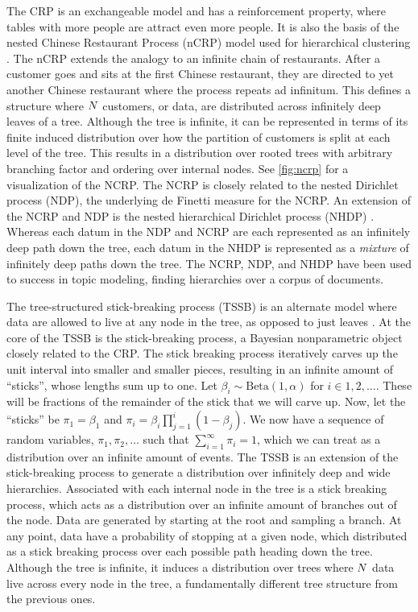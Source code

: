 The CRP is an exchangeable model
and has a reinforcement property, where
tables with more people are attract 
even more people. It is
also the basis of the nested Chinese
Restaurant Process (nCRP) model
used for hierarchical clustering \citep{Blei2010}.
The nCRP extends the analogy to
an infinite chain of restaurants.
After a customer goes and sits
at the first Chinese restaurant,
they are directed to yet another
Chinese restaurant where the process
repeats ad infinitum. This defines
a structure where $N$ customers, or data,
are distributed
across infinitely deep leaves of a tree.
Although the tree is infinite,
it can be represented in terms of its
finite induced distribution over
how the partition of customers is split
at each level of the tree. 
This results in a distribution over rooted trees
with arbitrary branching factor and ordering over internal nodes.
See \autoref{fig:ncrp} for a visualization of the NCRP.
The NCRP
is closely related to the nested Dirichlet process (NDP),
the underlying de Finetti measure for the NCRP.
An extension
of the NCRP and NDP is the nested hierarchical Dirichlet
process (NHDP) \citep{Paisley2014}. Whereas each datum in the NDP and NCRP
are each represented as an infinitely deep path
down the tree, each datum in the NHDP
is represented as a \emph{mixture} of
infinitely deep paths down the tree. 
The NCRP, NDP, and NHDP have been used to success
in topic modeling, finding hierarchies over
a corpus of documents.

The tree-structured stick-breaking process (TSSB)
is an alternate model 
where data are allowed to live at any node
in the tree, as opposed to just leaves \citep{Adams2010}.
At the core of the TSSB is the
stick-breaking process, a Bayesian nonparametric object
closely related to the CRP.
The stick breaking process
iteratively carves up the unit interval
into smaller and smaller pieces,
resulting in an infinite amount of ``sticks'',
whose lengths sum up to one.
Let $\beta_i \sim \text{Beta}(1, \alpha)$ for
$i \in 1,2,\ldots$.
These will be fractions of the remainder
of the stick that we will carve up.
Now, let the ``sticks''
be $\pi_1 = \beta_1$ and $\pi_i = \beta_i \prod_{j = 1}^i (1 - \beta_j)$.
We now have a sequence of
random variables, $\pi_1, \pi_2, \ldots$
such that $\sum_{i = 1}^\infty \pi_i = 1$,
which we can treat as a distribution over
an infinite amount of events.
The TSSB is an extension of the stick-breaking process
to generate a distribution
over infinitely deep and wide hierarchies.
Associated with each internal node in the tree
is a stick breaking process,
which acts as a distribution over an infinite
amount of branches out of the node.
Data are generated by starting at the root
and sampling a branch. At any point,
data have a probability of stopping at a given node,
which distributed as a stick breaking process
over each possible path heading down the tree.
Although the tree is infinite, it induces a distribution
over trees where $N$ data live across every node
in the tree, a fundamentally different tree structure
from the previous ones.


